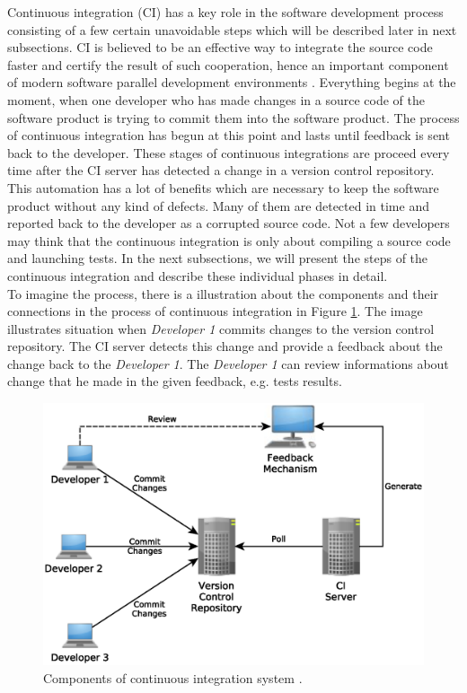 Continuous integration (CI) has a key role in the software development process consisting of a few certain unavoidable steps which will be described later in next subsections. CI is believed to be an effective way to integrate the source code faster and certify the result of such cooperation, hence an important component of modern software parallel development environments \cite{ResultsOfCIbuild}. Everything begins at the moment, when one developer who has made changes in a source code of the software product is trying to commit them into the software product. The process of continuous integration has begun at this point and lasts until feedback is sent back to the developer. These stages of continuous integrations are proceed every time after the CI server has detected a change in a version control repository. This automation has a lot of benefits which are necessary to keep the software product without any kind of defects. Many of them are detected in time and reported back to the developer as a corrupted source code. Not a few developers may think that the continuous integration is only about compiling a source code and launching tests. In the next subsections, we will present the steps of the continuous integration and describe these individual phases in detail.\\

To imagine the process, there is a illustration about the components and their connections in the process of continuous integration in Figure \ref{fig:cocis}. The image illustrates situation when \textit{Developer 1} commits changes to the version control repository. The CI server detects this change and provide a feedback about the change back to the \textit{Developer 1}. The \textit{Developer 1} can review informations about change that he made in the given feedback, e.g. tests results.

\begin{figure}[H]
    \centering
    \includegraphics[scale=0.6]{yEd/components_of_CI_system.eps}
    \caption{Components of continuous integration system \cite{CIbook}.}
    \label{fig:cocis}
\end{figure}

